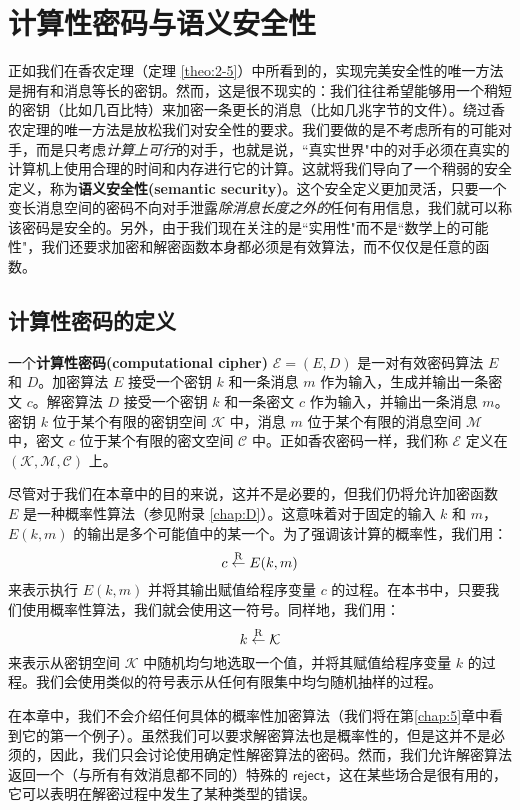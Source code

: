 \section{计算性密码与语义安全性}

正如我们在香农定理（定理 \ref{theo:2-5}）中所看到的，实现完美安全性的唯一方法是拥有和消息等长的密钥。然而，这是很不现实的：我们往往希望能够用一个稍短的密钥（比如几百比特）来加密一条更长的消息（比如几兆字节的文件）。绕过香农定理的唯一方法是放松我们对安全性的要求。我们要做的是不考虑所有的可能对手，而是只考虑\emph{计算上可行}的对手，也就是说，``真实世界"中的对手必须在真实的计算机上使用合理的时间和内存进行它的计算。这就将我们导向了一个稍弱的安全定义，称为\textbf{语义安全性(semantic security)}。这个安全定义更加灵活，只要一个变长消息空间的密码不向对手泄露\emph{除消息长度之外的}任何有用信息，我们就可以称该密码是安全的。另外，由于我们现在关注的是``实用性"而不是``数学上的可能性"，我们还要求加密和解密函数本身都必须是有效算法，而不仅仅是任意的函数。

\subsection{计算性密码的定义}\label{subsec:2-2-1}

一个\textbf{计算性密码(computational cipher)} $\mathcal{E}=(E,D)$ 是一对有效密码算法 $E$ 和 $D$。加密算法 $E$ 接受一个密钥 $k$ 和一条消息 $m$ 作为输入，生成并输出一条密文 $c$。解密算法 $D$ 接受一个密钥 $k$ 和一条密文 $c$ 作为输入，并输出一条消息 $m$。密钥 $k$ 位于某个有限的密钥空间 $\mathcal{K}$ 中，消息 $m$ 位于某个有限的消息空间 $\mathcal{M}$ 中，密文 $c$ 位于某个有限的密文空间 $\mathcal{C}$ 中。正如香农密码一样，我们称 $\mathcal{E}$ 定义在 $(\mathcal{K},\mathcal{M},\mathcal{C})$ 上。

尽管对于我们在本章中的目的来说，这并不是必要的，但我们仍将允许加密函数 $E$ 是一种概率性算法（参见附录 \ref{chap:D}）。这意味着对于固定的输入 $k$ 和 $m$，$E(k,m)$ 的输出是多个可能值中的某一个。为了强调该计算的概率性，我们用：
\[
c\overset{\rm R}\leftarrow E(k,m)
\]
来表示执行 $E(k,m)$ 并将其输出赋值给程序变量 $c$ 的过程。在本书中，只要我们使用概率性算法，我们就会使用这一符号。同样地，我们用：
\[
k\overset{\rm R}\leftarrow\mathcal{K}
\]
来表示从密钥空间 $\mathcal{K}$ 中随机均匀地选取一个值，并将其赋值给程序变量 $k$ 的过程。我们会使用类似的符号表示从任何有限集中均匀随机抽样的过程。

在本章中，我们不会介绍任何具体的概率性加密算法（我们将在第\ref{chap:5}章中看到它的第一个例子）。虽然我们可以要求解密算法也是概率性的，但是这并不是必须的，因此，我们只会讨论使用确定性解密算法的密码。然而，我们允许解密算法返回一个（与所有有效消息都不同的）特殊的 $\mathsf{reject}$，这在某些场合是很有用的，它可以表明在解密过程中发生了某种类型的错误。

